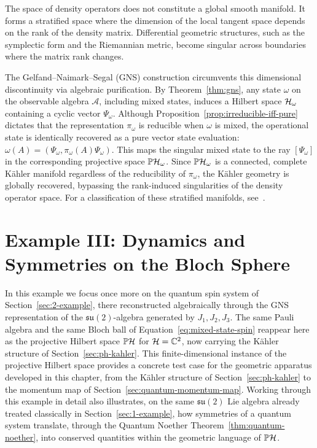 \begin{remark}
	\label{rem:purification-stratified-spaces}
	The space of density operators does not constitute a global smooth manifold. It forms a stratified space where the dimension of the local tangent space depends on the rank of the density matrix. Differential geometric structures, such as the symplectic form and the Riemannian metric, become singular across boundaries where the matrix rank changes.
	
	The Gelfand--Naimark--Segal (GNS) construction circumvents this dimensional discontinuity via algebraic purification. By Theorem~\ref{thm:gns}, any state $\omega$ on the observable algebra $\mathcal{A}$, including mixed states, induces a Hilbert space $\H_\omega$ containing a cyclic vector $\Psi_\omega$. Although Proposition~\ref{prop:irreducible-iff-pure} dictates that the representation $\pi_\omega$ is reducible when $\omega$ is mixed, the operational state is identically recovered as a pure vector state evaluation: $\omega(A) = (\Psi_\omega, \pi_\omega(A) \Psi_\omega)$. This maps the singular mixed state  to the ray $[\Psi_\omega]$ in the corresponding projective space $\PH_\omega$. Since $\PH_\omega$ is a connected, complete Kähler manifold regardless of the reducibility of $\pi_\omega$, the Kähler geometry is globally recovered, bypassing the rank-induced singularities of the density operator space. For a  classification of these stratified manifolds, see~\cite{bengtssonGeometryQuantumStates2017}.
\end{remark}

\newpage
\section{Example III: Dynamics and Symmetries on the Bloch Sphere}
\label{sec:ex-three}

In this example we focus once more on the quantum spin system of Section~\ref{sec:2-example}, there reconstructed algebraically through the GNS representation of the $\mathfrak{su}(2)$-algebra generated by $J_1,J_2,J_3$. The same Pauli algebra and the same Bloch ball of Equation~\eqref{eq:mixed-state-spin} reappear here as the projective Hilbert space $\PH$ for $\H=\C^2$, now carrying the Kähler structure of Section~\ref{sec:ph-kahler}.
This finite-dimensional instance of the projective Hilbert space provides a concrete test case for the geometric apparatus developed in this chapter, from the Kähler structure of Section~\ref{sec:ph-kahler} to the momentum map of Section~\ref{sec:quantum-momentum-map}. Working through this example in detail also illustrates, on the same $\mathfrak{su}(2)$ Lie algebra already treated classically in Section~\ref{sec:1-example}, how symmetries of a quantum system translate, through the Quantum Noether Theorem~\ref{thm:quantum-noether}, into conserved quantities within the geometric language of $\PH$.


